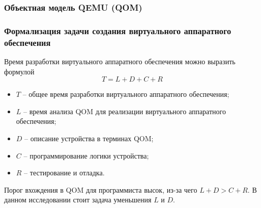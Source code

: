 \begin{frame}%
    \frametitle{Объектная модель QEMU (QOM)}
    \begin{figure}[!htbp]
    \end{figure}
\end{frame}


\begin{frame}%
    \frametitle{Формализация задачи создания виртуального аппаратного обеспечения}
    Время разработки виртуального аппаратного обеспечения
    можно выразить формулой
    \begin{equation}
        T = L + D + C + R
    \end{equation}
    \begin{itemize}
        \item $T$ -- общее время разработки виртуального аппаратного обеспечения;
        \item $L$ -- время анализа QOM для реализации виртуального аппаратного обеспечения;
        \item $D$ -- описание устройства в терминах QOM;
        \item $C$ -- программирование логики устройства;
        \item $R$ -- тестирование и отладка.
    \end{itemize}

    Порог вхождения в QOM для программиста высок, из-за чего
    $L + D > C + R$.
    В данном исследовании стоит задача уменьшения $L$ и $D$.
\end{frame}


